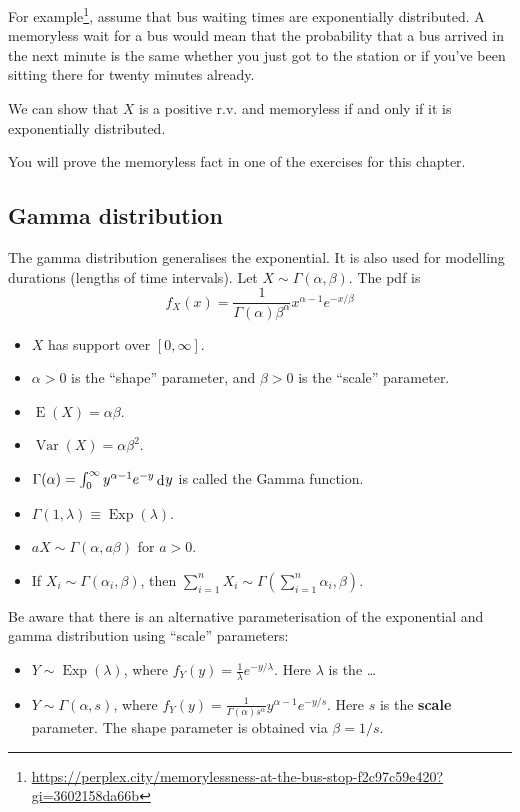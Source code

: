 \documentclass[
]{book}
\providecommand{\tightlist}{%
  \setlength{\itemsep}{0pt}\setlength{\parskip}{0pt}}
\DeclareMathOperator{\E}{E}
\DeclareMathOperator{\Var}{Var}
\DeclareMathOperator{\Exp}{Exp}
\DeclareMathOperator{\dd}{d}
\newcommand{\dint}{\dd\hspace{0.5pt}\!}
\theoremstyle{definition}
\theoremstyle{definition}
\theoremstyle{definition}
\theoremstyle{definition}
\theoremstyle{remark}
\begin{document}
For example\footnote{\footnotetext\url{https://perplex.city/memorylessness-at-the-bus-stop-f2c97c59e420?gi=3602158da66b}}, assume that bus waiting times are exponentially distributed. A memoryless wait for a bus would mean that the probability that a bus arrived in the next minute is the same whether you just got to the station or if you've been sitting there for twenty minutes already.

We can show that \(X\) is a positive r.v. and memoryless if and only if it is exponentially distributed.

You will prove the memoryless fact in one of the exercises for this chapter.

\hypertarget{gamma-distribution}{%
\subsection{Gamma distribution}\label{gamma-distribution}}

The gamma distribution generalises the exponential.
It is also used for modelling durations (lengths of time intervals).
Let \(X\sim\Gamma(\alpha,\beta)\).
The pdf is
\[
  f_X(x) = \frac{1}{\Gamma(\alpha)\beta^\alpha} x^{\alpha-1} e^{- x/\beta}
\]

\begin{itemize}
\tightlist
\item
  \(X\) has support over \([0,\infty]\).
\item
  \(\alpha>0\) is the ``shape'' parameter, and \(\beta >0\) is the ``scale'' parameter.
\item
  \(\E(X)=\alpha\beta\).
\item
  \(\Var(X)=\alpha\beta^2\).
\item
  \(\Gamma(\alpha)=\int_0^\infty y^{\alpha-1}e^{-y}\dint y\) is called the Gamma function.
\item
  \(\Gamma(1,\lambda) \equiv \Exp(\lambda)\).
\item
  \(aX\sim\Gamma(\alpha,a\beta)\) for \(a>0\).
\item
  If \(X_i\sim\Gamma(\alpha_i,\beta)\), then \(\sum_{i=1}^n X_i \sim \Gamma(\sum_{i=1}^n \alpha_i,\beta)\).
\end{itemize}

Be aware that there is an alternative parameterisation of the exponential and gamma distribution using ``scale'' parameters:

\begin{itemize}
\tightlist
\item
  \(Y \sim \Exp(\lambda)\), where \(f_Y(y)=\frac{1}{\lambda}e^{-y/\lambda}\). Here \(\lambda\) is the \ldots{}
\item
  \(Y \sim \Gamma(\alpha,s)\), where \(f_Y(y)=\frac{1}{\Gamma(\alpha)s^\alpha} y^{\alpha-1} e^{-y/s}\). Here \(s\) is the \textbf{scale} parameter. The shape parameter is obtained via \(\beta=1/s\).
\end{itemize}
\end{document}
